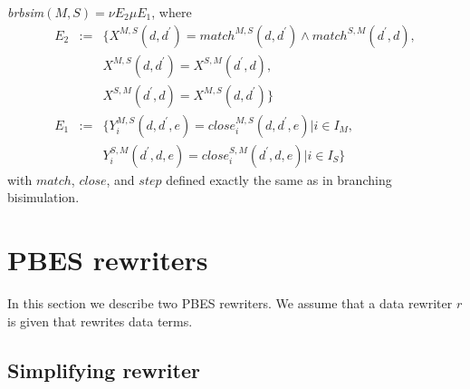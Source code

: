 \documentclass{article}
\begin{document}
\emph{brbsim}$(M,S)=\nu E_{2}\mu E_{1}$, where%
\begin{equation*}
\begin{array}{ccl}
E_{2} & := & \{X^{M,S}(d,d^{\prime })=match^{M,S}(d,d^{\prime })\wedge
match^{S,M}(d^{\prime },d), \\ 
&  & X^{M,S}(d,d^{\prime })=X^{S,M}(d^{\prime },d), \\ 
&  & X^{S,M}(d^{\prime },d)=X^{M,S}(d,d^{\prime })\} \\ 
E_{1} & := & \{Y_{i}^{M,S}(d,d^{\prime },e)=close_{i}^{M,S}(d,d^{\prime
},e)|i\in I_{M}, \\ 
&  & Y_{i}^{S,M}(d^{\prime },d,e)=close_{i}^{S,M}(d^{\prime },d,e)|i\in
I_{S}\}%
\end{array}%
\end{equation*}%
with $match$, $close$, and $step$ defined exactly the same as in branching
bisimulation.\newpage

\section{PBES rewriters}

In this section we describe two PBES rewriters. We assume that a data
rewriter $r$ is given that rewrites data terms.

\subsection{Simplifying rewriter}
\end{document}
